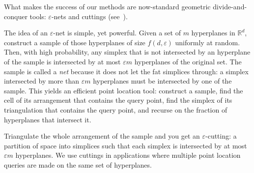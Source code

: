 What makes the success of our methods are now-standard geometric
divide-and-conquer tools: \(\varepsilon\)-nets and cuttings
(see~\cite[Sections~40.1and~40.4]{CMR04}).

The idea of an \(\varepsilon\)-net is simple, yet powerful. Given a set of
\(m\) hyperplanes in \(\mathbb{R}^d\), construct a sample of those hyperplanes
of size \(f(d, \varepsilon)\) uniformly at random. Then, with high probability,
any simplex that is not intersected by an hyperplane of the sample is intersected
by at most \(\varepsilon m\) hyperplanes of the original set. The sample is
called a \emph{net} because it does not let the fat simplices through: a
simplex intersected by more than \(\varepsilon m\) hyperplanes must be intersected
by one of the sample.
%
This yields an efficient point location tool: construct a sample, find the cell
of its arrangement that contains the query point, find the simplex of its
triangulation that contains the query point, and recurse on the fraction of
hyperplanes that intersect it.

Triangulate the whole arrangement of the sample and you get an
\(\varepsilon\)-cutting: a partition of space into simplices such
that each simplex is intersected by at most \(\varepsilon m\) hyperplanes.
We use cuttings in applications where multiple point location
queries are made on the same set of hyperplanes.
